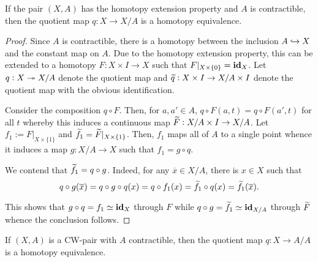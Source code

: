 \begin{proposition}
    If the pair $(X,A)$ has the homotopy extension property and $A$ is contractible, then the quotient map $q: X\to X/A$ is a homotopy equivalence.
\end{proposition}
\begin{proof}
    Since $A$ is contractible, there is a homotopy between the inclusion $A\hookrightarrow X$ and the constant map on $A$. Due to the homotopy extension property, this can be extended to a homotopy $F: X\times I\to X$ such that $F|_{X\times\{0\}} = \mathbf{id}_X$. Let $q: X\twoheadrightarrow X/A$ denote the quotient map and $\widetilde{q}: X\times I\to X/A\times I$ denote the quotient map with the obvious identification.

    Consider the composition $q\circ F$. Then, for $a,a'\in A$, $q\circ F(a,t) = q\circ F(a',t)$ for all $t$ whereby this induces a continuous map $\widetilde{F}: X/A\times I\to X/A$. Let $f_1 := F|_{X\times\{1\}}$ and $\widetilde{f}_1 = \widetilde{F}|_{X\times\{1\}}$. Then, $f_1$ maps all of $A$ to a single point whence it induces a map $g: X/A\to X$ such that $f_1 = g\circ q$.

    We contend that $\widetilde{f}_1 = q\circ g$. Indeed, for any $\overline x\in X/A$, there is $x\in X$ such that 
    \begin{equation*}
        q\circ g(\overline x) = q\circ g\circ q(x) = q\circ f_1(x) = \widetilde{f}_1\circ q(x) = \widetilde{f}_1(\overline x).
    \end{equation*}

    This shows that $g\circ q = f_1\simeq\mathbf{id}_X$ through $F$ while $q\circ g = \widetilde{f}_1\simeq\mathbf{id}_{X/A}$ through $\widetilde{F}$ whence the conclusion follows.
\end{proof}

\begin{corollary}
    If $(X,A)$ is a CW-pair with $A$ contractible, then the quotient map $q: X\to A/A$ is a homotopy equivalence.
\end{corollary}

\begin{example}
    
\end{example}